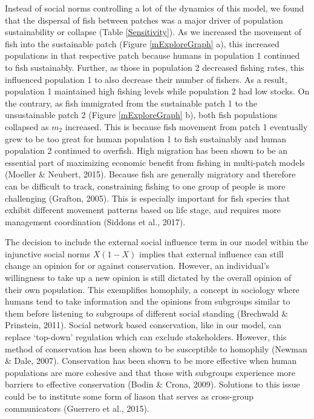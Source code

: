\documentclass[
]{article}
\begin{document}
Instead of social norms controlling a lot of the dynamics of this model, we found that the dispersal of fish between patches was a major driver of population sustainability or collapse (Table \ref{Sensitivity}). As we increased the movement of fish into the sustainable patch (Figure \ref{mExploreGraph} a), this increased populations in that respective patch because humans in population 1 continued to fish sustainably. Further, as those in population 2 decreased fishing rates, this influenced population 1 to also decrease their number of fishers. As a result, population 1 maintained high fishing levels while population 2 had low stocks. On the contrary, as fish immigrated from the sustainable patch 1 to the unsustainable patch 2 (Figure \ref{mExploreGraph} b), both fish populations collapsed as \(m_2\) increased. This is because fish movement from patch 1 eventually grew to be too great for human population 1 to fish sustainably and human population 2 continued to overfish. High migration has been shown to be an essential part of maximizing economic benefit from fishing in multi-patch models (Moeller \& Neubert, 2015). Because fish are generally migratory and therefore can be difficult to track, constraining fishing to one group of people is more challenging (Grafton, 2005). This is especially important for fish species that exhibit different movement patterns based on life stage, and requires more management coordination (Siddons et al., 2017).

The decision to include the external social influence term in our model within the injunctive social norms \(X(1-X)\) implies that external influence can still change an opinion for or against conservation. However, an individual's willingness to take up a new opinion is still dictated by the overall opinion of their own population. This exemplifies homophily, a concept in sociology where humans tend to take information and the opinions from subgroups similar to them before listening to subgroups of different social standing (Brechwald \& Prinstein, 2011). Social network based conservation, like in our model, can replace `top-down' regulation which can exclude stakeholders. However, this method of conservation has been shown to be susceptible to homophily (Newman \& Dale, 2007). Conservation has been shown to be more effective when human populations are more cohesive and that those with subgroups experience more barriers to effective conservation (Bodin \& Crona, 2009). Solutions to this issue could be to institute some form of liason that serves as cross-group communicators (Guerrero et al., 2015).
\end{document}
